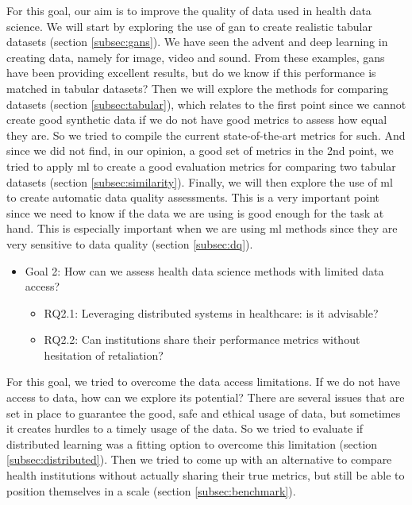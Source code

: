 For this goal, our aim is to improve the quality of data used in health data science. We will start by exploring the use of \ac{gan} to create realistic tabular datasets (section \ref{subsec:gans}). We have seen the advent and deep learning in creating data, namely for image, video and sound. From these examples, \acp{gan} have been providing excellent results, but do we know if this performance is matched in tabular datasets? Then we will explore the methods for comparing datasets (section \ref{subsec:tabular}), which relates to the first point since we cannot create good synthetic data if we do not have good metrics to assess how equal they are. So we tried to compile the current state-of-the-art metrics for such. And since we did not find, in our opinion, a good set of metrics in the 2nd point, we tried to apply \ac{ml} to create a good evaluation metrics for comparing two tabular datasets (section \ref{subsec:similarity}). Finally,  we will then explore the use of \ac{ml} to create automatic data quality assessments. This is a very important point since we need to know if the data we are using is good enough for the task at hand. This is especially important when we are using \ac{ml} methods since they are very sensitive to data quality (section \ref{subsec:dq}).

\begin{itemize}

    \item Goal 2: How can we assess health data science methods with limited data access?
    \begin{itemize}
        \item RQ2.1: Leveraging distributed systems in healthcare: is it advisable?
        \item RQ2.2: Can institutions share their performance metrics without hesitation of retaliation?
    \end{itemize}
\end{itemize}

For this goal, we tried to overcome the data access limitations. If we do not have access to data, how can we explore its potential? There are several issues that are set in place to guarantee the good, safe and ethical usage of data, but sometimes it creates hurdles to a timely usage of the data. So we tried to evaluate if distributed learning was a fitting option to overcome this limitation (section \ref{subsec:distributed}). Then we tried to come up with an alternative to compare health institutions without actually sharing their true metrics, but still be able to position themselves in a scale (section \ref{subsec:benchmark}). 

